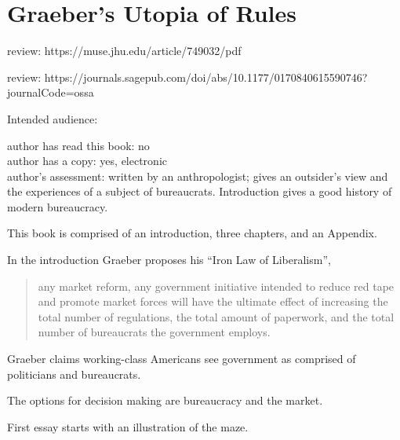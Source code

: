 \section{Graeber's Utopia of Rules\label{review:graeber_utopia}}

\cite{2015_Graeber}

review: https://muse.jhu.edu/article/749032/pdf

review: https://journals.sagepub.com/doi/abs/10.1177/0170840615590746?journalCode=ossa


Intended audience:

author has read this book: no\\
author has a copy: yes, electronic\\
author's assessment: written by an anthropologist; gives an outsider's view and the experiences of a subject of bureaucrats. Introduction gives a good history of modern bureaucracy.


This book is comprised of an introduction, three chapters, and an Appendix. 

In the introduction Graeber proposes his ``Iron Law of Liberalism'',
\begin{quote}
    any market reform, any government initiative intended to reduce red tape and promote market forces will have the ultimate effect of increasing the total number of regulations, the total amount of paperwork, and the total number of bureaucrats the government employs.
\end{quote}

Graeber claims working-class Americans see government as comprised of politicians and bureaucrats.

The options for decision making are bureaucracy and the market.


First essay starts with an illustration of the maze.